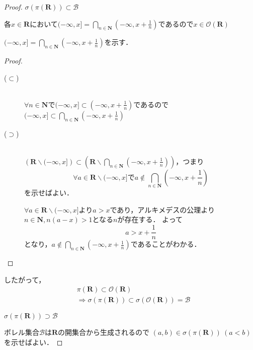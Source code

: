 \documentclass{jsarticle}
\begin{document}
\begin{proof}
    $\sigma(\pi(\mathbf{R})) \subset \mathcal{B}$

    各$x\in\mathbf{R}$において$(-\infty,x]=\bigcap_{n\in\mathbf{N}}(-\infty,x+\frac{1}{n})$であるので$x\in\mathcal{O}(\mathbf{R})$

\begin{itembox}[l]{}
    $(-\infty,x]=\bigcap_{n\in\mathbf{N}}(-\infty,x+\frac{1}{n})$を示す．
    \begin{proof}
    \begin{description}
        \item[($\subset$)]\mbox{}\\
            $\forall n\in\mathbf{N}$で$(-\infty,x]\subset(-\infty,x+\frac{1}{n})$であるので$(-\infty,x]\subset \bigcap_{n\in\mathbf{N}}(-\infty,x+\frac{1}{n})$
        \item[($\supset$)]\mbox{}\\
            $\left(\mathbf{R}\backslash(-\infty,x]\right) \subset \left(\mathbf{R}\backslash\bigcap_{n\in\mathbf{N}}(-\infty,x+\frac{1}{n})\right)$，つまり
            \begin{equation}
                \forall a\in\mathbf{R}\backslash(-\infty,x] で a\notin\bigcap_{n\in\mathbf{N}}(-\infty,x+\frac{1}{n}) \nonumber
            \end{equation}
            を示せばよい．\par
            $\forall a\in\mathbf{R}\backslash(-\infty,x]$より$a>x$であり，アルキメデスの公理より$n\in\mathbf{N},n(a-x)>1$となる$n$が存在する．
            よって
            \begin{equation}
                a>x+\frac{1}{n} \nonumber 
            \end{equation}
            となり，$a\notin\bigcap_{n\in\mathbf{N}}(-\infty,x+\frac{1}{n})$であることがわかる．
    \end{description}
    \end{proof}
\end{itembox}
    
    したがって，
    \begin{align}
        &\pi(\mathbf{R}) \subset \mathcal{O}(\mathbf{R}) \nonumber \\
        &\Rightarrow \sigma(\pi(\mathbf{R})) \subset \sigma(\mathcal{O}(\mathbf{R}))=\mathcal{B} 
    \end{align}
    
    $\sigma(\pi(\mathbf{R})) \supset \mathcal{B}$
    
    ボレル集合$\mathcal{B}$は$\mathbf{R}$の開集合から生成されるので
    $(a,b) \in \sigma(\pi(\mathbf{R}))\ (a<b)$を示せばよい．


\end{proof}
\end{document}
